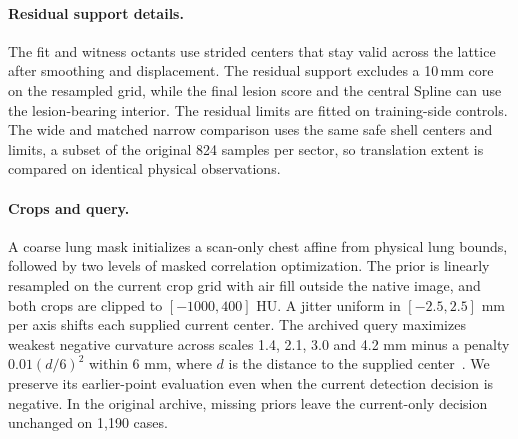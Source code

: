 \paragraph{Residual support details.}
The fit and witness octants use strided centers that stay valid across the lattice after smoothing and displacement.
The residual support excludes a 10\,mm core on the resampled grid, while the final lesion score and the central Spline can use the lesion-bearing interior.
The residual limits are fitted on training-side controls.
The wide and matched narrow comparison uses the same safe shell centers and limits, a subset of the original 824 samples per sector, so translation extent is compared on identical physical observations.

\paragraph{Crops and query.}
A coarse lung mask initializes a scan-only chest affine from physical lung bounds, followed by two levels of masked correlation optimization. The prior is linearly resampled on the current crop grid with air fill outside the native image, and both crops are clipped to $[-1000,400]$ HU. A jitter uniform in $[-2.5,2.5]$ mm per axis shifts each supplied current center. The archived query maximizes weakest negative curvature across scales 1.4, 2.1, 3.0 and 4.2 mm minus a penalty $0.01(d/6)^2$ within 6 mm, where $d$ is the distance to the supplied center~\cite{li2003selective}. We preserve its earlier-point evaluation even when the current detection decision is negative. In the original archive, missing priors leave the current-only decision unchanged on 1,190 cases.


